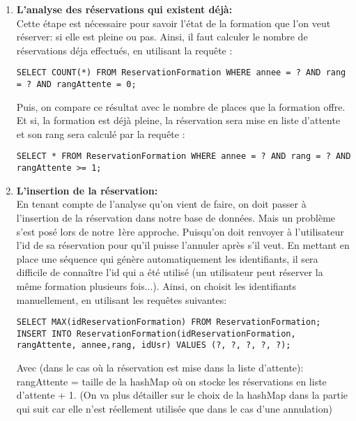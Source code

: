 \begin{enumerate}
    \item \textbf{L’analyse des réservations qui existent déjà:}\\
Cette étape est nécessaire pour savoir l'état de la formation que l'on veut réserver: si elle est pleine ou pas. Ainsi, il faut calculer le nombre de réservations déja effectués, en utilisant la requête : 
    \begin{lstlisting}[style=SQL, label=sql-e]
SELECT COUNT(*) FROM ReservationFormation WHERE annee = ? AND rang = ? AND rangAttente = 0;
\end{lstlisting}
Puis, on compare ce résultat avec le nombre de places que la formation offre. Et si, la formation est déjà pleine, la réservation sera mise en liste d'attente et son rang sera calculé par la requête :
\begin{lstlisting}[style=SQL, label=sql-e]
 SELECT * FROM ReservationFormation WHERE annee = ? AND rang = ? AND rangAttente >= 1;
    \end{lstlisting}

    \item \textbf{L’insertion de la réservation:}\\
En tenant compte de l'analyse qu'on vient de faire, on doit passer à l'insertion de la réservation dans notre base de données. Mais un problème s'est posé lors de notre 1ère approche. Puisqu'on doit renvoyer à l'utilisateur l'id de sa réservation pour qu'il puisse l'annuler après s'il veut. En mettant en place une séquence qui génère automatiquement les identifiants, il sera difficile de connaître l'id qui a été utilisé (un utilisateur peut réserver la même formation plusieurs fois...). Ainsi, on choisit les identifiants manuellement, en utilisant les requêtes suivantes: 
\begin{lstlisting}[style=SQL, label=sql-e]
SELECT MAX(idReservationFormation) FROM ReservationFormation;
INSERT INTO ReservationFormation(idReservationFormation, rangAttente, annee,rang, idUsr) VALUES (?, ?, ?, ?, ?);
\end{lstlisting}
Avec (dans le cas où la réservation est mise dans la liste d'attente): rangAttente = taille de la hashMap où on stocke les réservations en liste d'attente + 1. (On  va plus détailler sur le choix de la hashMap dans la partie qui suit car elle n'est réellement utilisée que dans le cas d'une annulation)


\end{enumerate}
